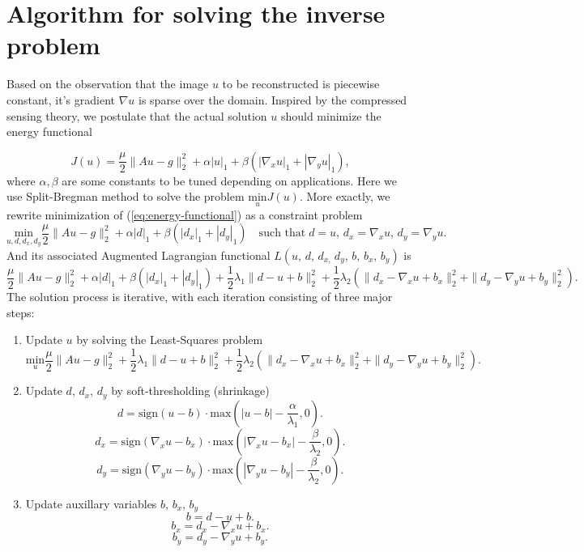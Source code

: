 \documentclass[english]{article}\usepackage[]{graphicx}\usepackage[]{color}
\begin{document}
\section{Algorithm for solving the inverse problem}

Based on the observation that the image $u$ to be reconstructed is
piecewise constant, it's gradient $\nabla u$ is sparse over
the domain. Inspired by the compressed sensing theory, we postulate
that the actual solution $u$ should minimize the energy functional 

\begin{equation}
J(u)=\frac{\mu}{2}\|Au-g\|_{2}^{2}+\alpha|u|_{1}+\beta(|\nabla_{x}u|_{1}+|\nabla_{y}u|_{1}),\label{eq:energy-functional}
\end{equation}
where $\alpha,\beta$ are some constants to be tuned depending on
applications. Here we use Split-Bregman method to solve the problem
$\underset{u}{{\text{{min}}}}J(u)$. More exactly, we rewrite minimization
of (\ref{eq:energy-functional}) as a constraint problem 
\[
\underset{u,d,d_{x},d_{y}}{{\text{{min}}}}\frac{\mu}{2}\|Au-g\|_{2}^{2}+\alpha|d|_{1}+\beta(|d_{x}|_{1}+|d_{y}|_{1})\quad\text{such that}\; d=u,\, d_{x}=\nabla_{x}u,\, d_{y}=\nabla_{y}u.
\]
And its associated Augmented Lagrangian functional $L(u,\, d,\, d_{x,}\, d_{y},\, b,\, b_{x},\, b_{y})$ is 
\[
\frac{\mu}{2}\|Au-g\|_{2}^{2}+\alpha|d|_{1}+\beta(|d_{x}|_{1}+|d_{y}|_{1})+\frac{1}{2}\lambda_{1}\|d-u+b\|_{2}^{2}+\frac{{1}}{2}\lambda_{2}(\|d_{x}-\nabla_{x}u+b_{x}\|_{2}^{2}+\|d_{y}-\nabla_{y}u+b_{y}\|_{2}^{2}).
\]
 The solution process is iterative, with each iteration consisting
of three major steps:
\begin{enumerate}
\item Update $u$ by solving the Least-Squares problem
\begin{equation}
\underset{u}{{\text{{min}}}}\frac{\mu}{2}\|Au-g\|_{2}^{2}+\frac{1}{2}\lambda_{1}\|d-u+b\|_{2}^{2}+\frac{{1}}{2}\lambda_{2}(\|d_{x}-\nabla_{x}u+b_{x}\|_{2}^{2}+\|d_{y}-\nabla_{y}u+b_{y}\|_{2}^{2}).\label{eq:LS-problem}
\end{equation}

\item Update $d,\, d_{x},\, d_{y}$ by soft-thresholding (shrinkage)
\[
d=\text{{sign}}(u-b)\cdot\text{{max}}(|u-b|-\frac{\alpha}{\lambda_{1}},0).
\]
\[
d_{x}=\text{{sign}}(\nabla_{x}u-b_{x})\cdot\text{{max}}(|\nabla_{x}u-b_{x}|-\frac{\beta}{\lambda_{2}},0).
\]
\[
d_{y}=\text{{sign}}(\nabla_{y}u-b_{y})\cdot\text{{max}}(|\nabla_{y}u-b_{y}|-\frac{\beta}{\lambda_{2}},0).
\]
\[
\]

\item Update auxillary variables $b,\, b_{x},\, b_{y}$
\[
b=d-u+b.
\]
\[
b_{x}=d_{x}-\nabla_{x}u+b_{x}.
\]
\[
b_{y}=d_{y}-\nabla_{y}u+b_{y}.
\]

\end{enumerate}
\end{document}
